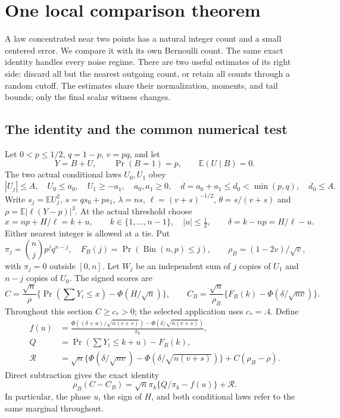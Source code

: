 \documentclass[11pt,a4paper]{article}
\numberwithin{equation}{section}
\theoremstyle{definition}
\theoremstyle{remark}
\begin{document}
\section{One local comparison theorem}\label{cut49:shortloc:section}

A law concentrated near two points has a natural integer count and a small
centered error. We compare it with its own Bernoulli count. The same exact
identity handles every noise regime. There are two useful estimates of its
right side: discard all but the nearest outgoing count, or retain all counts
through a random cutoff. The estimates share their normalization, moments,
and tail bounds; only the final scalar witness changes.

\subsection{The identity and the common numerical test}

Let $0<p\le1/2$, $q=1-p$, $v=pq$, and let
\[
 Y=B+U,\qquad \Pr(B=1)=p,\qquad \mathbb E(U\mid B)=0.
\]
The two actual conditional laws $U_0,U_1$ obey
\begin{equation}\label{cut49:shortloc:support}
 |U_j|\le A,\quad U_0\le a_0,\quad U_1\ge-a_1,\quad
 a_0,a_1\ge0,\quad d=a_0+a_1\le d_0<\min(p,q),\quad d_0\le A.
\end{equation}
Write $s_j=\mathbb E U_j^2$, $s=qs_0+ps_1$, $\lambda=ns$,
$\ell=(v+s)^{-1/2}$, $\theta=s/(v+s)$ and
$\rho=\mathbb E|\ell(Y-p)|^3$. At the actual threshold choose
\[
 x=np+H/\ell=k+u,\qquad k\in\{1,\ldots,n-1\},\quad |u|\le\tfrac12,
 \qquad \delta=k-np=H/\ell-u.
\]
Either nearest integer is allowed at a tie. Put
\[
 \pi_j=\binom njp^jq^{n-j},\quad F_B(j)=\Pr(\operatorname{Bin}(n,p)\le j),
 \qquad \rho_B=(1-2v)/\sqrt v,
\]
with $\pi_j=0$ outside $[0,n]$. Let $W_j$ be an independent sum of $j$
copies of $U_1$ and $n-j$ copies of $U_0$. The signed scores are
\[
 C=\frac{\sqrt n}{\rho}\{\Pr(\textstyle\sum Y_i\le x)-\Phi(H/\sqrt n)\},
 \qquad C_B=\frac{\sqrt n}{\rho_B}\{F_B(k)-\Phi(\delta/\sqrt{nv})\}.
\]
Throughout this section $C\ge c_*>0$; the selected application uses $c_*=.4$.
Define
\begin{align}
 f(u)&=\frac{\Phi((\delta+u)/\sqrt{n(v+s)})-
                    \Phi(\delta/\sqrt{n(v+s)})}{\pi_k},\label{cut49:shortloc:f}\\
 Q&=\Pr(\textstyle\sum Y_i\le k+u)-F_B(k),\nonumber\\
 \mathcal R&=\sqrt n\{\Phi(\delta/\sqrt{nv})-
                 \Phi(\delta/\sqrt{n(v+s)})\}+C(\rho_B-\rho).\nonumber
\end{align}
Direct subtraction gives the exact identity
\begin{equation}\label{cut49:shortloc:master}
 \rho_B(C-C_B)=\sqrt n\pi_k\{Q/\pi_k-f(u)\}+\mathcal R.
\end{equation}
In particular, the phase $u$, the sign of $H$, and both conditional laws
refer to the same marginal throughout.
\end{document}
